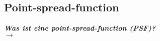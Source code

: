 \subsection{\label{subsec:FZV8}Point-spread-function}
\textbf{\textit{Was ist eine point-spread-function (PSF)?}} \\
$\rightarrow$